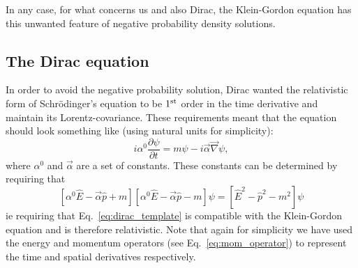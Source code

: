 In any case, for what concerns us and also Dirac, the Klein-Gordon equation has this unwanted feature of negative probability density solutions.

\subsection{The Dirac equation}
In order to avoid the negative probability solution, Dirac wanted the relativistic form of Schr\"odinger's equation to be $1^{\rm st}$ order in the time derivative and maintain its Lorentz-covariance. These requirements meant that the equation should look something like (using natural units for simplicity):
\begin{equation}
\label{eq:dirac_template}
i\alpha^0\frac{\partial\psi}{\partial t}=m\psi-i\vec{\alpha} \vec{\nabla}\psi,
\end{equation}
where $\alpha^0$ and $\vec{\alpha}$ are a set of constants.
These constants can be determined by requiring that 
\begin{equation}
\label{eq:dirac_constraint}
[\alpha^0\hat{E}-\vec{\alpha}\hat{p}+m][\alpha^0\hat{E}-\vec{\alpha}\hat{p}-m]\psi=[\hat{E}^{2}-\hat{p}^2-m^2]\psi
\end{equation}
ie requiring that Eq.~\ref{eq:dirac_template} is compatible with the Klein-Gordon equation and is therefore relativistic. Note that again for simplicity we have used the energy and momentum operators (see Eq.~\ref{eq:mom_operator}) to represent the time and spatial derivatives respectively.

\\\\

